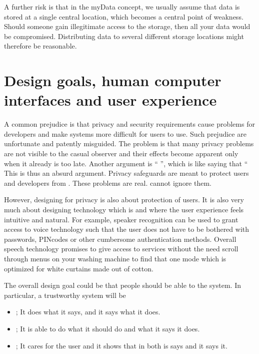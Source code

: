 \documentclass[letterpaper,10pt,english]{jupyterBook}
\begin{document}
\sphinxAtStartPar
A further risk is that in the myData concept, we usually assume that
data is stored at a single central location, which becomes a central
point of weakness. Should someone gain illegitimate access to the
storage, then all your data would be compromised. Distributing data to
several different storage locations might therefore be reasonable.


\section{Design goals, human computer interfaces and user experience}
\label{\detokenize{Security_and_privacy:design-goals-human-computer-interfaces-and-user-experience}}
\sphinxAtStartPar
A common prejudice is that privacy and security requirements cause
problems for developers and make systems more difficult for users to
use. Such prejudice are unfortunate and patently misguided. The problem
is that many privacy problems are not visible to the casual observer and
their effects become apparent only when it already is too late. Another
argument is “  ”, which is like saying that “ This is thus an absurd argument.
Privacy safeguards are meant to protect users and developers from .
These problems are real.  cannot ignore them.

\sphinxAtStartPar
However, designing for privacy is also  about protection of
users. It is also very much about designing technology which is  and where the user experience feels intuitive and natural. For
example, speaker recognition can be used to grant access to voice
technology such that the user does not have to be bothered with
passwords, PIN\sphinxhyphen{}codes or other cumbersome authentication methods. Overall
speech technology promises to give access to services without the need
scroll through menus on your washing machine to find that one mode which
is optimized for white curtains made out of cotton.

\sphinxAtStartPar
The overall design goal could be that people should be able to 
the system. In particular, a trustworthy system will be
\begin{itemize}
\item {} 
\sphinxAtStartPar
{}; It does what it says, and it says what it does.

\item {} 
\sphinxAtStartPar
{}; It is able to do what it should do and what it says it
does.

\item {} 
\sphinxAtStartPar
{}; It cares for the user and it shows that in both 
is says and  it says it.

\end{itemize}
\end{document}
